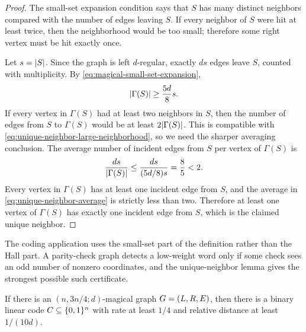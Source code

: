 \begin{proof}
	The small-set expansion condition says that \(S\) has many distinct neighbors compared with the number of edges leaving \(S\). If every neighbor of \(S\) were hit at least twice, then the neighborhood would be too small; therefore some right vertex must be hit exactly once.

	Let \(s=\lvert S\rvert\). Since the graph is left \(d\)-regular, exactly \(ds\) edges leave \(S\), counted with multiplicity. By \cref{eq:magical-small-set-expansion},
	\begin{equation}
		\label{eq:unique-neighbor-large-neighborhood}
		\lvert\Gamma(S)\rvert\geq \frac{5d}{8}s.
	\end{equation}
	If every vertex in \(\Gamma(S)\) had at least two neighbors in \(S\), then the number of edges from \(S\) to \(\Gamma(S)\) would be at least \(2\lvert\Gamma(S)\rvert\). This is compatible with \cref{eq:unique-neighbor-large-neighborhood}, so we need the sharper averaging conclusion. The average number of incident edges from \(S\) per vertex of \(\Gamma(S)\) is
	\begin{equation}
		\label{eq:unique-neighbor-average}
		\frac{ds}{\lvert\Gamma(S)\rvert}\leq \frac{ds}{(5d/8)s}=\frac{8}{5}<2.
	\end{equation}
	Every vertex in \(\Gamma(S)\) has at least one incident edge from \(S\), and the average in \cref{eq:unique-neighbor-average} is strictly less than two. Therefore at least one vertex of \(\Gamma(S)\) has exactly one incident edge from \(S\), which is the claimed unique neighbor.
\end{proof}

The coding application uses the small-set part of the definition rather than the Hall part. A parity-check graph detects a low-weight word only if some check sees an odd number of nonzero coordinates, and the unique-neighbor lemma gives the strongest possible such certificate.

\begin{theorem}
	\label{thm:magical-code}
	If there is an \((n,3n/4;d)\)-magical graph \(G=(L,R,E)\), then there is a binary linear code \(C\subseteq\{0,1\}^n\) with rate at least \(1/4\) and relative distance at least \(1/(10d)\).
\end{theorem}

